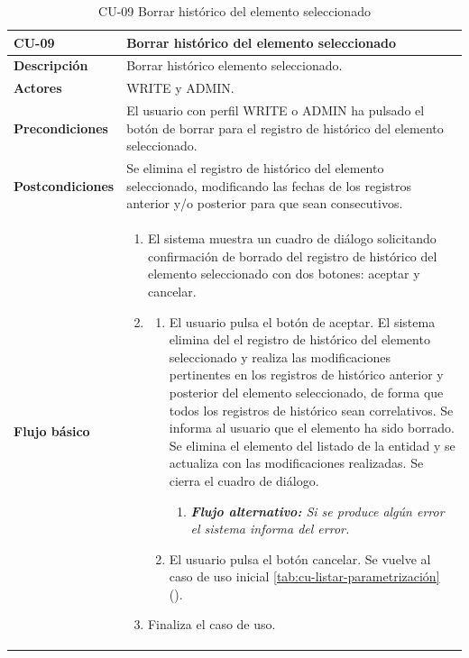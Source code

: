 \begin{table} [H]
    \centering
    \setlength{\leftmargini}{0.4cm}
	\resizebox{14cm}{!} { %
    \begin{tabular}{| m{3cm} | m{11cm} |}   
    \hline
	  \textbf{CU-09} & \textbf{Borrar histórico del elemento seleccionado} \\\hline
	  \textbf{Descripción} & Borrar histórico elemento seleccionado. \\\hline
	  \textbf{Actores} & WRITE y ADMIN. \\\hline
	  \textbf{Precondiciones} & El usuario con perfil WRITE o ADMIN ha pulsado el botón de borrar para el registro de histórico del elemento seleccionado. \\\hline
	  \textbf{Postcondiciones} & Se elimina el registro de histórico del elemento seleccionado, modificando las fechas de los registros anterior y/o posterior para que sean consecutivos. \\\hline
	  \textbf{Flujo básico} & 
		\begin{enumerate}
	  	\item El sistema muestra un cuadro de diálogo solicitando confirmación de borrado del registro de histórico del elemento seleccionado con dos botones: aceptar y cancelar.
		\item 
			\begin{enumerate}	
			   \item El usuario pulsa el botón de aceptar. El sistema elimina del el registro de histórico del elemento seleccionado y realiza las modificaciones pertinentes en los registros de histórico anterior y posterior del elemento seleccionado, de forma que todos los registros de histórico sean correlativos. Se informa al usuario que el elemento ha sido borrado. Se elimina el elemento del listado de la entidad  y se actualiza con las modificaciones realizadas. Se cierra el cuadro de diálogo.
			   \begin{enumerate}	
			   \item  \textit{\textbf{Flujo alternativo:} Si se produce algún error el sistema informa del error.}
			   \end{enumerate}
			   \item El usuario pulsa el botón cancelar. Se vuelve al caso de uso inicial \ref{tab:cu-listar-parametrización} (\pageref{tab:cu-listar-parametrización}).
			\end{enumerate}
	  \item Finaliza el caso de uso.
	  \end{enumerate} 	  	  
	  \\\hline
    \end{tabular}
    } %
    \caption{CU-09 Borrar histórico del elemento seleccionado}
    \label{tab:cu-borrar-historico-elemento-chap-analisis}
\end{table}





